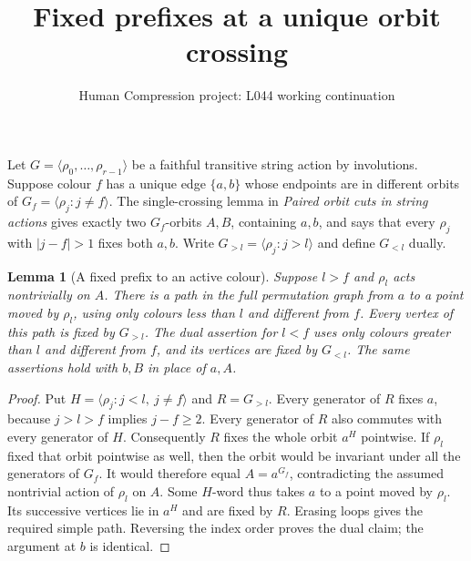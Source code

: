 \documentclass[11pt,a4paper]{article}
\title{Fixed prefixes at a unique orbit crossing}
\author{Human Compression project: L044 working continuation}
\date{}
\newtheorem{lemma}{Lemma}
\newcommand{\gen}[1]{\langle#1\rangle}
\begin{document}
\maketitle
Let $G=\gen{\rho_0,\ldots,\rho_{r-1}}$ be a faithful transitive
string action by involutions. Suppose colour $f$ has a unique edge
$\{a,b\}$ whose endpoints are in different orbits of
$G_f=\gen{\rho_j:j\ne f}$. The single-crossing lemma in
\emph{Paired orbit cuts in string actions} gives exactly two
$G_f$-orbits $A,B$, containing $a,b$, and says that every
$\rho_j$ with $|j-f|>1$ fixes both $a,b$. Write
$G_{>l}=\gen{\rho_j:j>l}$ and define $G_{<l}$ dually.

\begin{lemma}[A fixed prefix to an active colour]\label{prefix}
Suppose $l>f$ and $\rho_l$ acts nontrivially on $A$. There is a
path in the full permutation graph from $a$ to a point moved by
$\rho_l$, using only colours less than $l$ and different from $f$.
Every vertex of this path is fixed by $G_{>l}$.
The dual assertion for $l<f$ uses only colours greater than $l$
and different from $f$, and its vertices are fixed by $G_{<l}$.
The same assertions hold with $b,B$ in place of $a,A$.
\end{lemma}
\begin{proof}
Put $H=\gen{\rho_j:j<l,\ j\ne f}$ and $R=G_{>l}$.
Every generator of $R$ fixes $a$, because $j>l>f$ implies
$j-f\ge2$. Every generator of $R$ also commutes with every
generator of $H$. Consequently $R$ fixes the whole orbit $a^H$
pointwise. If $\rho_l$ fixed that orbit pointwise as well, then
the orbit would be invariant under all the generators of $G_f$.
It would therefore equal $A=a^{G_f}$, contradicting the assumed
nontrivial action of $\rho_l$ on $A$. Some $H$-word thus takes
$a$ to a point moved by $\rho_l$. Its successive vertices lie
in $a^H$ and are fixed by $R$. Erasing loops gives the required
simple path. Reversing the index order proves the dual claim;
the argument at $b$ is identical.
\end{proof}
\end{document}
